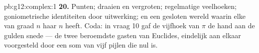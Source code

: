 \begin{solution}{pb:g12:complex:1}
\textbf{20.} Punten; draaien en vergroten; regelmatige veelhoeken;
goniometrische identiteiten door uitwerking; en een gesloten wereld waarin
elke  van graad $n$ haar $n$  heeft. Coda: in vraag 10 gaf
de vijfhoek van $\pi$ de hand aan de gulden snede --- de twee beroemdste
gasten van Euclides, eindelijk aan elkaar voorgesteld door een som van vijf
pijlen die nul is.
\end{solution}
